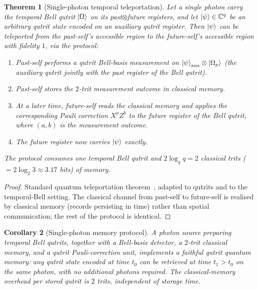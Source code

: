 ﻿\documentclass[12pt]{article}
\newtheorem{theorem}{Theorem}[section]
\newtheorem{corollary}[theorem]{Corollary}
\newcommand{\CC}{\mathbb{C}}
\begin{document}
\begin{theorem}[Single-photon temporal teleportation]\label{thm:temporal_teleport}
Let a single photon carry the temporal Bell qutrit $\ket{\Omega}$ on
its past$\otimes$future registers, and let $\ket{\psi} \in \CC^q$ be an
arbitrary qutrit state encoded on an auxiliary qutrit register.  Then
$\ket{\psi}$ can be teleported from the past-self's accessible region to
the future-self's accessible region with fidelity $1$, via the protocol:
\begin{enumerate}[label=(\roman*),noitemsep]
  \item Past-self performs a qutrit Bell-basis measurement on
    $\ket{\psi}_{\rm aux}\otimes\ket{\Omega_p}$ (the auxiliary qutrit jointly
    with the past register of the Bell qutrit).
  \item Past-self stores the $2$-trit measurement outcome in classical
    memory.
  \item At a later time, future-self reads the classical memory and applies
    the corresponding Pauli correction
    $X^a Z^b$ to the future register of the Bell qutrit, where $(a,b)$ is the
    measurement outcome.
  \item The future register now carries $\ket{\psi}$ exactly.
\end{enumerate}
The protocol consumes one temporal Bell qutrit and $2 \log_q q = 2$ classical
trits ($= 2 \log_2 3 \approx 3.17$ bits) of memory.
\end{theorem}

\begin{proof}
Standard quantum teleportation theorem~\cite{Bennett1993}, adapted to qutrits
and to the temporal-Bell setting.  The classical channel from past-self to
future-self is realised by classical memory (records persisting in time)
rather than spatial communication; the rest of the protocol is identical.
\end{proof}

\begin{corollary}[Single-photon memory protocol]\label{cor:memory_protocol}
A photon source preparing temporal Bell qutrits, together with a Bell-basis
detector, a $2$-trit classical memory, and a qutrit Pauli-correction unit,
implements a faithful qutrit quantum memory: any qutrit state encoded at
time $t_0$ can be retrieved at time $t_1 > t_0$ on the same photon, with no
additional photons required.  The classical-memory overhead per stored qutrit
is $2$ trits, independent of storage time.
\end{corollary}
\end{document}
